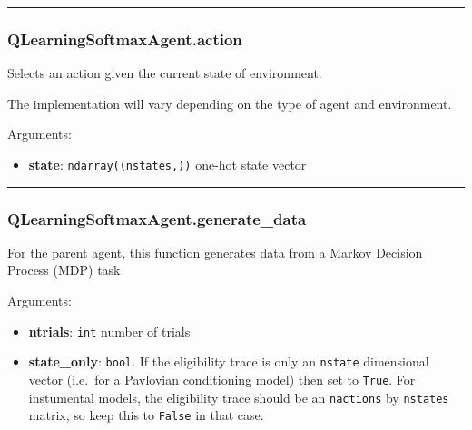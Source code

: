 \begin{center}\rule{0.5\linewidth}{\linethickness}\end{center}

\subsubsection{QLearningSoftmaxAgent.action}\label{qlearningsoftmaxagent.action}

\begin{Shaded}
\begin{Highlighting}[]
\end{Highlighting}
\end{Shaded}

Selects an action given the current state of environment.

The implementation will vary depending on the type of agent and
environment.

Arguments:

\begin{itemize}
\tightlist
\item
  \textbf{state}: \texttt{ndarray((nstates,))} one-hot state vector
\end{itemize}

\begin{center}\rule{0.5\linewidth}{\linethickness}\end{center}

\subsubsection{QLearningSoftmaxAgent.generate\_data}\label{qlearningsoftmaxagent.generate_data}

\begin{Shaded}
\begin{Highlighting}[]
\OperatorTok{=}\NormalTok{)}
\end{Highlighting}
\end{Shaded}

For the parent agent, this function generates data from a Markov
Decision Process (MDP) task

Arguments:

\begin{itemize}
\tightlist
\item
  \textbf{ntrials}: \texttt{int} number of trials
\item
  \textbf{state\_only}: \texttt{bool}. If the eligibility trace is only
  an \texttt{nstate} dimensional vector (i.e.~for a Pavlovian
  conditioning model) then set to \texttt{True}. For instumental models,
  the eligibility trace should be an \texttt{nactions} by
  \texttt{nstates} matrix, so keep this to \texttt{False} in that case.
\end{itemize}

